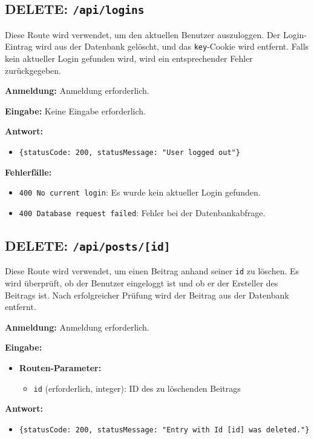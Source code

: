 \documentclass[a4paper,12pt]{article}
\begin{document}
\newpage
\subsection{DELETE: \texttt{/api/logins}}

Diese Route wird verwendet, um den aktuellen Benutzer auszuloggen. Der Login-Eintrag wird aus der Datenbank gelöscht, und das \texttt{key}-Cookie wird entfernt. Falls kein aktueller Login gefunden wird, wird ein entsprechender Fehler zurückgegeben.

\textbf{Anmeldung:} Anmeldung erforderlich.

\textbf{Eingabe:} Keine Eingabe erforderlich.

\textbf{Antwort:}
\begin{itemize}
    \item \texttt{\{statusCode: 200, statusMessage: "User logged out"\}}
\end{itemize}

\textbf{Fehlerfälle:}
\begin{itemize}
    \item \texttt{400 No current login}: Es wurde kein aktueller Login gefunden.
    \item \texttt{400 Database request failed}: Fehler bei der Datenbankabfrage.
\end{itemize}

\newpage
\subsection{DELETE: \texttt{/api/posts/[id]}}

Diese Route wird verwendet, um einen Beitrag anhand seiner \texttt{id} zu löschen. Es wird überprüft, ob der Benutzer eingeloggt ist und ob er der Ersteller des Beitrags ist. Nach erfolgreicher Prüfung wird der Beitrag aus der Datenbank entfernt.

\textbf{Anmeldung:} Anmeldung erforderlich.

\textbf{Eingabe:}
\begin{itemize}
    \item \textbf{Routen-Parameter:}
    \begin{itemize}
        \item \texttt{id} (erforderlich, integer): ID des zu löschenden Beitrags
    \end{itemize}
\end{itemize}

\textbf{Antwort:}
\begin{itemize}
    \item \texttt{\{statusCode: 200, statusMessage: "Entry with Id [id] was deleted."\}}
\end{itemize}
\end{document}
